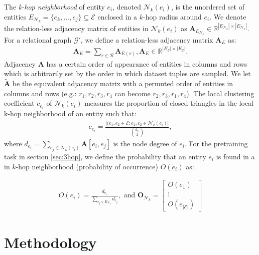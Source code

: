\documentclass{article}
\newcommand{\set}[1]{\ensuremath{\mathcal{#1}}}
\newcommand{\relset}[0]{{\set{R}}}
\newcommand{\entset}[0]{{\set{E}}}
\begin{document}
The \emph{k-hop neighborhood} of entity $e_i$, denoted $\mathcal{N}_k(e_i)$, is the unordered set of entities $E_{\mathcal{N}_k} =  \{e_k, \dots, e_j\} \subseteq \entset$ enclosed in a $k$-hop radius around $e_i$. 
We denote the relation-less adjacency matrix of entities in $\mathcal{N}_k(e_i)$ as 
$\mathbf{A}_{E_{\mathcal{N}_k}}\in 
\mathbb{R}^{|E_{\mathcal{N}_k}| 
\times |E_{\mathcal{N}_k}|}$. 
For a relational graph $\mathcal{G'}$, we define a relation-less adjacency matrix $\mathbf{A}_{E}$ as:
\begin{align}
\mathbf{A}_{E} = \sum_{r \in \relset} \mathbf{A}_{E(r)}, \mathbf{A}_{E} \in \mathbb{R}^{|E_{\entset}| \times |E_{\entset}|}.
\label{eq:adj}
\end{align}
Adjacency $\mathbf{A}$ has a certain order of appearance of entities in columns and rows which is arbitrarily set by the order in which dataset tuples are sampled. 
We let $\widetilde{\mathbf{A}}$ be the equivalent adjacency matrix with a permuted order of entities in columns and rows (e.g.: $r_1, r_2, r_3, r_4$ can become $r_2, r_3, r_1, r_4$). 
The local clustering coefficient $c_{e_i}$ \cite{Watts-Colective-1998} of $\mathcal{N}_k(e_i)$ measures the proportion of closed triangles in the local k-hop neighborhood of an entity such that:
\begin{align}
c_{e_i} = \frac{|(e_1,e_2\in \entset : e_1,e_2 \in \mathcal{N}_k(e_i)|}{\binom{d_{e_i}}{2}},
\label{eq:lcc}
\end{align}
where $d_{e_i}=\sum_{e_j \in \mathcal{N}_k(e_i)}\mathbf{A}[e_i,e_j]$ is the node degree of $e_i$. For the pretraining task in section \ref{sec:3hop}, we define the probability that an entity $e_i$ is found in a in $k$-hop neighborhood (probability of occurrence) $O(e_i)$ as:

\vspace{-0.6cm}
\begin{align}
O(e_i) = \frac{d_{e_i}}{\sum_{e_j \in E_{\mathcal{N}_k}}d_{e_j}}, \text{ and } \mathbf{O}_{\mathcal{N}_k} = 
\begin{bmatrix}
O(e_1) \\
\vdots \\
O(e_{|\entset|})
\end{bmatrix}
\label{eq:occurence}
\end{align}



\section{Methodology}
\label{sec:method}
\end{document}
